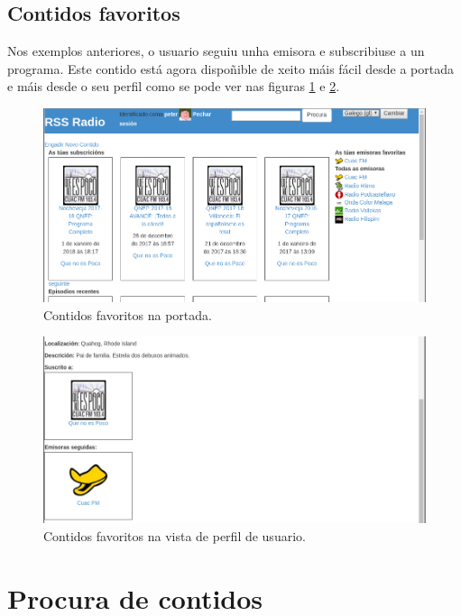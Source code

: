 \subsection{Contidos favoritos}

Nos exemplos anteriores, o usuario seguiu unha emisora e subscribiuse a un programa. Este contido está agora dispoñible de xeito máis fácil desde a portada e máis desde o seu perfil como se pode ver nas figuras \ref{fig:um-index-auth} e \ref{fig:um-userd2}.

\begin{figure}[H]
	\centering
	\includegraphics[scale=0.45,keepaspectratio=true]{./images/usermanual/um-index-auth.png}
	\caption{Contidos favoritos na portada.}
	\label{fig:um-index-auth}
\end{figure}


\begin{figure}[H]
	\centering
	\includegraphics[scale=0.45,keepaspectratio=true]{./images/usermanual/um-userd2.png}
	\caption{Contidos favoritos na vista de perfil de usuario.}
	\label{fig:um-userd2}
\end{figure}


\section{Procura de contidos}

